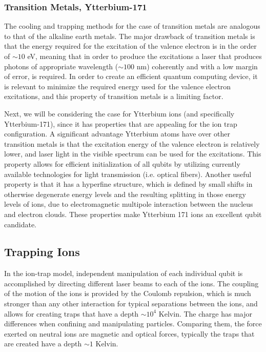 \documentclass[../main.tex]{subfiles}
\begin{document}
\subsubsection{Transition Metals, Ytterbium-171}
The cooling and trapping methods for the case of transition metals are analogous to that of the alkaline earth metals. The major drawback of transition metals is that the energy required for the excitation of the valence electron is in the order of $\sim 10$ eV, meaning that in order to produce the excitations a laser that produces photons of appropriate wavelength ($\sim 100$ nm) coherently and with a low margin of error, is required. In order to create an efficient quantum computing device, it is relevant to minimize the required energy used for the valence electron excitations, and this property of transition metals is a limiting factor.
\par Next, we will be considering the case for Ytterbium ions (and specifically Ytterbium-171), since it has properties that are appealing for the ion trap configuration. 
A significant advantage Ytterbium atoms have over other transition metals is that the excitation energy of the valence electron is relatively lower, and laser light in the visible spectrum can be used for the excitations. This property allows for efficient initialization of all qubits by utilizing  currently available technologies for light transmission (i.e. optical fibers). Another useful property is that it has a hyperfine structure, which is defined by small shifts in otherwise degenerate energy levels and the resulting splitting in those energy levels of ions, due to electromagnetic multipole interaction between the nucleus and electron clouds. These properties make Ytterbium 171 ions an excellent qubit candidate.\cite{PhysRevA.76.052314,10.1116/5.0065951}




\subsection{Trapping Ions}
In the ion-trap model, independent manipulation of each individual qubit is accomplished by directing different laser beams to each of the ions. The coupling of the motion of the ions is provided by the Coulomb repulsion, which is much stronger than any other interaction for typical separations between the ions, and allows for creating traps that have a depth $\sim 10^4 $ Kelvin. The charge has major differences when confining and manipulating particles. Comparing them, the force exerted on neutral ions are magnetic and optical forces, typically the traps that are created have a depth $\sim 1$ Kelvin.
\end{document}

